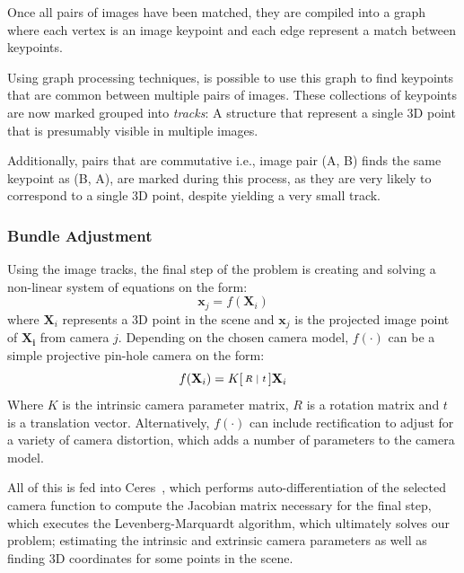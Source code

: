 \documentclass[preprint,acmtog]{acmart}
\begin{document}
Once all pairs of images have been matched, they are compiled into a graph where
each vertex is an image keypoint and each edge represent a match between
keypoints.


Using graph processing techniques, is possible to use this graph to find
keypoints that are common between multiple pairs of images. These collections of
keypoints are now marked grouped into \emph{tracks}: A structure that represent
a single 3D point that is presumably visible in multiple images.

Additionally, pairs that are commutative i.e., image pair (A, B) finds the same
keypoint as (B, A), are marked during this process, as they are very likely to
correspond to a single 3D point, despite yielding a very small track.


\subsubsection{Bundle Adjustment}

Using the image tracks, the final step of the problem is creating and solving a
non-linear system of equations on the form:
%
\begin{equation*}
  \mathbf{x}_{j} = f(\mathbf{X}_{i})
\end{equation*}
%
where $\mathbf{X}_{i}$ represents a 3D point in the scene and $\mathbf{x}_{j}$
is the projected image point of $\mathbf{X_{i}}$ from camera $j$. Depending on
the chosen camera model, $f(\cdot)$ can be a simple projective pin-hole camera on
the form:
%
\begin{equation*}
  f(\mathbf{X}_{i}) =
  K \begin{bsmallmatrix}R & | & t\end{bsmallmatrix} \mathbf{X}_{i}
\end{equation*}
%
Where $K$ is the intrinsic camera parameter matrix, $R$ is a rotation matrix and
$t$ is a translation vector. Alternatively, $f(\cdot)$ can include rectification to
adjust for a variety of camera distortion, which adds a number of parameters to
the camera model.

All of this is fed into Ceres~\cite{ceres-solver}, which performs
auto-differentiation of the selected camera function to compute the Jacobian
matrix necessary for the final step, which executes the Levenberg-Marquardt
algorithm\cite{More78}, which ultimately solves our problem; estimating the
intrinsic and extrinsic camera parameters as well as finding 3D coordinates for
some points in the scene.
\end{document}
